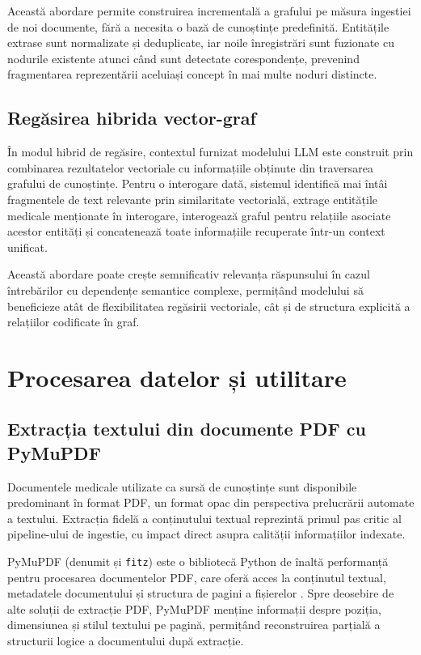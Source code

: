 \documentclass[12pt, a4paper, oneside, romanian]{teza-upb}
\begin{document}
Această abordare permite construirea incrementală a grafului pe măsura ingestiei de noi documente, fără a necesita o bază de cunoștințe predefinită. Entitățile extrase sunt normalizate și deduplicate, iar noile înregistrări sunt fuzionate cu nodurile existente atunci când sunt detectate corespondențe, prevenind fragmentarea reprezentării aceluiași concept în mai multe noduri distincte.

\subsection{Regăsirea hibrida vector-graf}

În modul hibrid de regăsire, contextul furnizat modelului LLM este construit prin combinarea rezultatelor vectoriale cu informațiile obținute din traversarea grafului de cunoștințe. Pentru o interogare dată, sistemul identifică mai întâi fragmentele de text relevante prin similaritate vectorială, extrage entitățile medicale menționate în interogare, interogează graful pentru relațiile asociate acestor entități și concatenează toate informațiile recuperate într-un context unificat.

Această abordare poate crește semnificativ relevanța răspunsului în cazul întrebărilor cu dependențe semantice complexe, permițând modelului să beneficieze atât de flexibilitatea regăsirii vectoriale, cât și de structura explicită a relațiilor codificate în graf.

\section{Procesarea datelor și utilitare}

\subsection{Extracția textului din documente PDF cu PyMuPDF}

Documentele medicale utilizate ca sursă de cunoștințe sunt disponibile predominant în format PDF, un format opac din perspectiva prelucrării automate a textului. Extracția fidelă a conținutului textual reprezintă primul pas critic al pipeline-ului de ingestie, cu impact direct asupra calității informațiilor indexate.

PyMuPDF (denumit și \texttt{fitz}) este o bibliotecă Python de înaltă performanță pentru procesarea documentelor PDF, care oferă acces la conținutul textual, metadatele documentului și structura de pagini a fișierelor \cite{pymupdf_doc}. Spre deosebire de alte soluții de extracție PDF, PyMuPDF menține informații despre poziția, dimensiunea și stilul textului pe pagină, permițând reconstruirea parțială a structurii logice a documentului după extracție.
\end{document}
